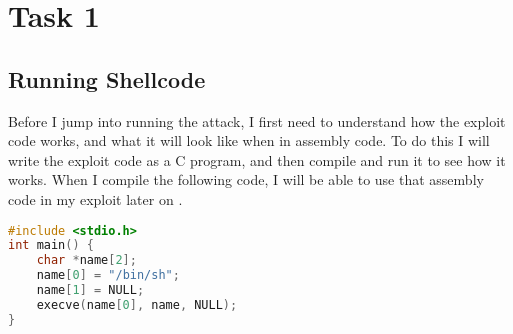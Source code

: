 \documentclass[14pt]{extarticle}
\begin{document}
\section{Task 1}
\subsection{Running Shellcode}
  Before I jump into running the attack, I first need to understand how the exploit code works, and what it will look like when in assembly code. To do this I will write the exploit code as a C program, and then compile and run it to see how it works. When I compile the following code, I will be able to use that assembly code in my exploit later on \cite{seed-bof}. 
\begin{lstlisting}[language=c]
#include <stdio.h>
int main() {
    char *name[2];
    name[0] = "/bin/sh";
    name[1] = NULL;
    execve(name[0], name, NULL);
}
\end{lstlisting}
\end{document}
